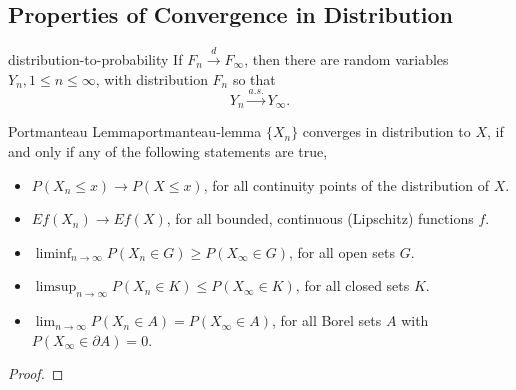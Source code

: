 \subsection{Properties of Convergence in Distribution}

\begin{lemma}{}{distribution-to-probability}
    If $F_n\stackrel{d}{\rightarrow}F_\infty$, then there are random variables $Y_n,1\leq n\leq \infty$, with distribution $F_n$ so that
    \begin{equation}
        Y_n\stackrel{a.s.}{\rightarrow}Y_\infty.
    \end{equation}
\end{lemma}

\begin{theorem}{Portmanteau Lemma}{portmanteau-lemma}
    $\{X_n\}$ converges in distribution to $X$, if and only if any of the following statements are true,
    \begin{itemize}
        \item $P(X_n\leq x)\rightarrow P(X\leq x)$, for all continuity points of the distribution of $X$.
        \item $Ef(X_n)\rightarrow Ef(X)$, for all bounded, continuous (Lipschitz) functions $f$.
        \item $\liminf_{n\rightarrow\infty}P\left(X_{n} \in G\right)\geq P\left(X_{\infty}\in G\right)$, for all open sets $G$.
        \item $\limsup_{n \rightarrow\infty}P\left(X_{n} \in K\right) \leq P\left(X_{\infty} \in K\right)$, for all closed sets $K$.
        \item $\lim_{n\rightarrow\infty}P\left(X_{n}\in A\right)=P\left(X_{\infty}\in A\right)$, for all Borel sets $A$ with $P\left(X_{\infty}\in \partial A\right)=0$.
    \end{itemize}
\end{theorem}

\begin{proof}
    
\end{proof}

